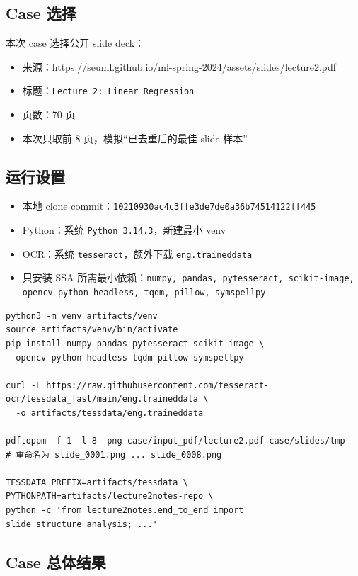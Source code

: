 \documentclass[a4paper]{article}
\begin{document}
\subsection{Case 选择}

本次 case 选择公开 slide deck：

\begin{itemize}
\item 来源：\url{https://seuml.github.io/ml-spring-2024/assets/slides/lecture2.pdf}
\item 标题：\texttt{Lecture 2: Linear Regression}
\item 页数：70 页
\item 本次只取前 8 页，模拟“已去重后的最佳 slide 样本”
\end{itemize}

\subsection{运行设置}

\begin{itemize}
\item 本地 clone commit：\texttt{10210930ac4c3ffe3de7de0a36b74514122ff445}
\item Python：系统 \texttt{Python 3.14.3}，新建最小 venv
\item OCR：系统 \texttt{tesseract}，额外下载 \texttt{eng.traineddata}
\item 只安装 SSA 所需最小依赖：\texttt{numpy, pandas, pytesseract, scikit-image, opencv-python-headless, tqdm, pillow, symspellpy}
\end{itemize}

\begin{lstlisting}[caption={本次 case 的最小运行步骤}]
python3 -m venv artifacts/venv
source artifacts/venv/bin/activate
pip install numpy pandas pytesseract scikit-image \
  opencv-python-headless tqdm pillow symspellpy

curl -L https://raw.githubusercontent.com/tesseract-ocr/tessdata_fast/main/eng.traineddata \
  -o artifacts/tessdata/eng.traineddata

pdftoppm -f 1 -l 8 -png case/input_pdf/lecture2.pdf case/slides/tmp
# 重命名为 slide_0001.png ... slide_0008.png

TESSDATA_PREFIX=artifacts/tessdata \
PYTHONPATH=artifacts/lecture2notes-repo \
python -c 'from lecture2notes.end_to_end import slide_structure_analysis; ...'
\end{lstlisting}

\subsection{Case 总体结果}
\end{document}

